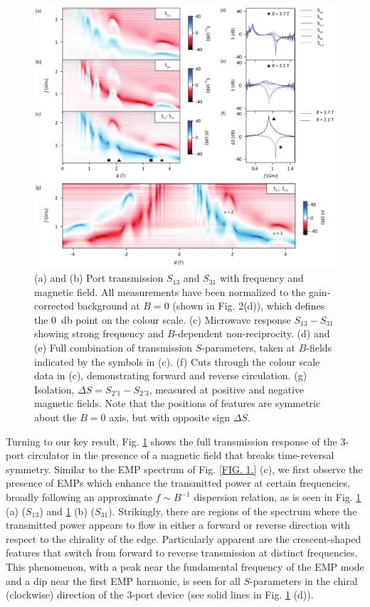 \begin{figure}
\includegraphics[width=\textwidth]{fig3_QH}
\caption[Non-reciprocal response of the quantum Hall circulator]{\label{FIG. 3.}
(a) and (b) Port transmission $S_{13}$ and $S_{31}$ with frequency and magnetic field. All measurements have been normalized to the gain-corrected background at $B = 0$ (shown in Fig. 2(d)), which defines the \SI{0}{\decibel} point on the colour scale.
(c) Microwave response $S_{13}-S_{31}$ showing strong frequency and $B$-dependent non-reciprocity.
(d) and (e) Full combination of transmission $S$-parameters, taken at $B$-fields indicated by the symbols in (c).
(f) Cuts through the colour scale data in (c), demonstrating forward and reverse circulation.
(g) Isolation, $\Delta S = S_{2'1}-S_{2'3}$, measured at positive and negative magnetic fields. Note that the positions of features are symmetric about the $B = 0$ axis, but with opposite sign $\Delta S$.}
\end{figure}

Turning to our key result, Fig. \ref{FIG. 3.} shows the full transmission response of the 3-port circulator in the presence of a magnetic field that breaks time-reversal symmetry. Similar to the EMP spectrum of Fig. \ref{FIG. 1.} (c), we first observe the presence of EMPs which enhance the transmitted power at certain frequencies, broadly following an approximate $f \sim B^{-1}$ dispersion relation, as is seen in Fig. \ref{FIG. 3.} (a) ($S_{13}$) and \ref{FIG. 3.} (b) ($S_{31}$). Strikingly, there are regions of the spectrum where the transmitted power appears to flow in either a forward or reverse direction with respect to the chirality of the edge. Particularly apparent are the crescent-shaped features that switch from forward to reverse transmission at distinct frequencies. This phenomenon, with a peak near the fundamental frequency of the EMP mode and a dip near the first EMP harmonic, is seen for all $S$-parameters in the chiral (clockwise) direction of the 3-port device (see solid lines in Fig. \ref{FIG. 3.} (d)).

